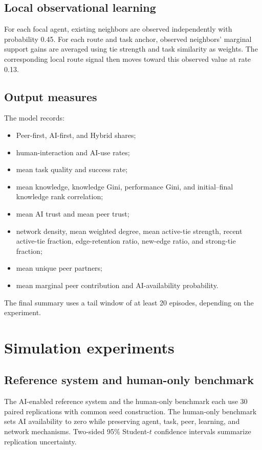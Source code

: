 \documentclass[11pt]{article}
\begin{document}
\subsection{Local observational learning}
For each focal agent, existing neighbors are observed independently with probability 0.45. For each route and task anchor, observed neighbors' marginal support gains are averaged using tie strength and task similarity as weights. The corresponding local route signal then moves toward this observed value at rate 0.13.

\subsection{Output measures}
The model records:
\begin{itemize}
\item Peer-first, AI-first, and Hybrid shares;
\item human-interaction and AI-use rates;
\item mean task quality and success rate;
\item mean knowledge, knowledge Gini, performance Gini, and initial--final knowledge rank correlation;
\item mean AI trust and mean peer trust;
\item network density, mean weighted degree, mean active-tie strength, recent active-tie fraction, edge-retention ratio, new-edge ratio, and strong-tie fraction;
\item mean unique peer partners;
\item mean marginal peer contribution and AI-availability probability.
\end{itemize}
The final summary uses a tail window of at least 20 episodes, depending on the experiment.

\section{Simulation experiments}
\subsection{Reference system and human-only benchmark}
The AI-enabled reference system and the human-only benchmark each use 30 paired replications with common seed construction. The human-only benchmark sets AI availability to zero while preserving agent, task, peer, learning, and network mechanisms. Two-sided 95\% Student-$t$ confidence intervals summarize replication uncertainty.
\end{document}
